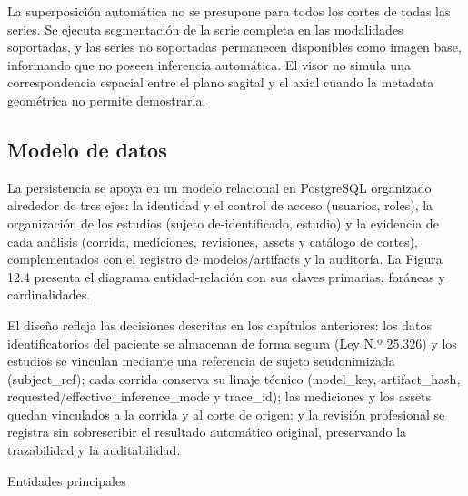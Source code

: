 La superposición automática no se presupone para todos los cortes de todas las series. Se ejecuta segmentación de la serie completa en las modalidades soportadas, y las series no soportadas permanecen disponibles como imagen base, informando que no poseen inferencia automática. El visor no simula una correspondencia espacial entre el plano sagital y el axial cuando la metadata geométrica no permite demostrarla.

\subsection{Modelo de datos}

La persistencia se apoya en un modelo relacional en PostgreSQL organizado alrededor de tres ejes: la identidad y el control de acceso (usuarios, roles), la organización de los estudios (sujeto de-identificado, estudio) y la evidencia de cada análisis (corrida, mediciones, revisiones, assets y catálogo de cortes), complementados con el registro de modelos/artifacts y la auditoría. La Figura 12.4 presenta el diagrama entidad-relación con sus claves primarias, foráneas y cardinalidades.

El diseño refleja las decisiones descritas en los capítulos anteriores: los datos identificatorios del paciente se almacenan de forma segura (Ley N.º 25.326) y los estudios se vinculan mediante una referencia de sujeto seudonimizada (subject\_ref); cada corrida conserva su linaje técnico (model\_key, artifact\_hash, requested/effective\_inference\_mode y trace\_id); las mediciones y los assets quedan vinculados a la corrida y al corte de origen; y la revisión profesional se registra sin sobrescribir el resultado automático original, preservando la trazabilidad y la auditabilidad.


Entidades principales


